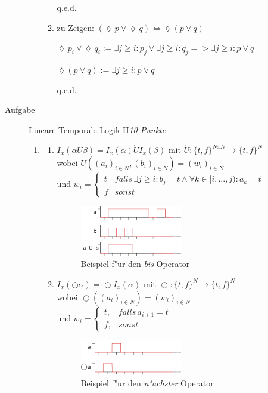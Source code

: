 \documentclass[a4paper,twoside,12pt]{article}
\newcounter{AUFGNR}
\newcommand{\AUFGABE}[2]{\vspace{0.3cm}\item[Aufgabe~\arabic{AUFGNR}]\stepcounter{AUFGNR} #1\hfill\emph{#2}}
\begin{document}
\begin{description}
\begin{enumerate}
\begin{enumerate}
q.e.d.

\item zu Zeigen: $(\lozenge\, p \vee \lozenge\, q) \Leftrightarrow \lozenge (p \vee q)$

$
\lozenge\, p_i \vee \lozenge\, q_i := \exists j \geq i: p_j \vee \exists j \geq i: q_j => \exists j \geq i: p \vee q
$

$
\lozenge (p \vee q) := \exists j \geq i: p \vee q
$

q.e.d.
\end{enumerate}
\end{enumerate}

\AUFGABE{Lineare Temporale Logik II}{10 Punkte}
\begin{enumerate}
\item
\begin{enumerate}
\item
$I_x(\alpha U \beta) = I_x(\alpha )\dot{U} I_x(\beta)$ mit $\dot{U}: \{t,f\}^{N x N} \rightarrow \{t,f\}^N$ \\
wobei $\dot{U}((a_i)_{i\in N}, (b_i)_{i\in N}) = (w_i)_{i\in N}$\\
und $w_i = \begin{cases} t & falls\, \exists j\geq i: b_j = t \land \forall k\in [i, ..., j): a_k = t \\ f & sonst \end{cases}$
\begin{figure}
  \includegraphics[width=0.5\textwidth]{2_a_1.png}
\caption{Beispiel f"ur den \textit{bis} Operator}
\end{figure}

\item
$I_x(\bigcirc \alpha) = \dot{\bigcirc} I_x(\alpha )$ mit $\dot{\bigcirc}: \{t,f\}^N \rightarrow \{t,f\}^N$ \\
wobei $\dot{\bigcirc}((a_i)_{i\in N}) = (w_i)_{i\in N}$\\
und $w_i = \begin{cases}
 t, & falls\, a_{i+1} = t\\
 f, & sonst
 \end{cases}$
 	\begin{figure}
 	   \includegraphics[width=0.5\textwidth]{2_a_2.png}
	\caption{Beispiel f"ur den \textit{n"achster} Operator}
 	\end{figure}


\end{enumerate}
\end{enumerate}
\end{description}
\end{document}

